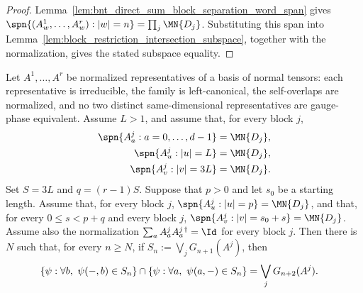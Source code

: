 \begin{proof}
    \leanok
    Lemma~\ref{lem:bnt_direct_sum_block_separation_word_span} gives
    $\spn\{(A^1_w,\ldots,A^r_w): |w|=n\} = \prod_j\MN{D_j}$.
    Substituting this span into
    Lemma~\ref{lem:block_restriction_intersection_subspace}, together with the
    normalization, gives the stated subspace equality.
\end{proof}

\begin{lemma}
    \label{lem:bnt_direct_sum_block_separation_period_window_block_intersection}
    \leanok
    Let $A^1,\ldots,A^r$ be normalized representatives of a basis of normal
    tensors: each representative is irreducible, the family is left-canonical,
    the self-overlaps are normalized, and no two distinct same-dimensional
    representatives are gauge-phase equivalent. Assume $L>1$, and assume that,
    for every block $j$,
    \begin{align}
        \spn\{A^j_a:a=0,\ldots,d-1\}
         & =\MN{D_j}, \notag \\
        \spn\{A^j_u:|u|=L\}
         & =\MN{D_j}, \notag \\
        \spn\{A^j_v:|v|=3L\}
         & =\MN{D_j}. \notag
    \end{align}
    Set $S=3L$ and $q=(r-1)S$. Suppose that $p>0$ and let $s_0$ be a
    starting length. Assume that, for every block $j$,
    $\spn\{A^j_u:|u|=p\} =\MN{D_j}$,
    and that, for every $0\le s<p+q$ and every block $j$,
    $\spn\{A^j_v:|v|=s_0+s\} =\MN{D_j}$.
    Assume also the normalization
    $\sum_a A^j_aA^{j\,\dagger}_a=\Id$ for every block $j$. Then there is
    $N$ such that, for every $n\ge N$, if
    $S_n:=\bigvee_jG_{n+1}(A^j)$, then
    \begin{align}
        \left\{\psi:\forall b,\ \psi(-,b)\in S_n\right\}
        \cap
        \left\{\psi:\forall a,\ \psi(a,-)\in S_n\right\}
         & =
        \bigvee_jG_{n+2}(A^j). \notag
    \end{align}
\end{lemma}

